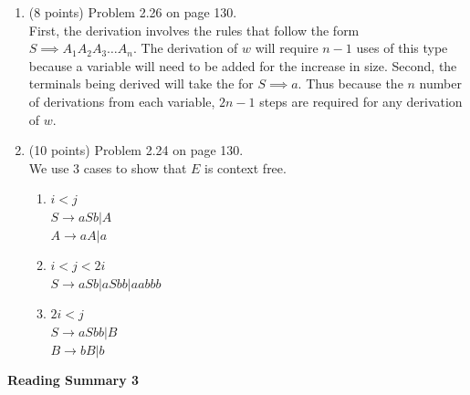 \documentclass[11pt]{article}
\begin{document}
\begin{enumerate}
  \item (8 points) Problem 2.26 on page 130. \\
    First, the derivation involves the rules that follow the form $S \implies A_1A_2A_3 \dots A_n$.
    The derivation of $w$ will require $n-1$ uses of this type because a variable
    will need to be added for the increase in size. Second, the terminals being derived
    will take the for $S \implies a$. Thus because the $n$ number of derivations from
    each variable, $2n-1$ steps are required for any derivation of $w$.
    
  \item (10 points) Problem 2.24 on page 130. \\
    We use 3 cases to show that $E$ is context free.
    \begin{enumerate}
      \item $i < j $ \\
	    $S \to aSb | A $ \\
	    $A \to aA | a$
      \item $i<j<2i$ \\
	    $S \to aSb | aSbb | aabbb$
      \item $2i < j$ \\
	    $S \to aSbb|B $ \\
	    $B \to bB | b $
    \end{enumerate}

\end{enumerate}

\pagebreak
\setlength{\parindent}{1cm}
\centerline{\bf Reading Summary 3}
\end{document}

